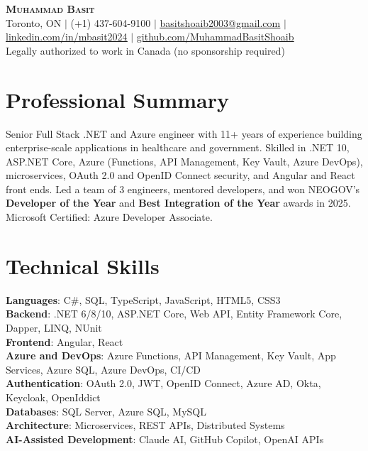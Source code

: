 \documentclass[letterpaper,11pt]{article}
\begin{document}
\begin{center}
    \textbf{\Huge \scshape Muhammad Basit} \\ \vspace{1pt}
    \small Toronto, ON $|$ (+1) 437-604-9100 $|$ \href{mailto:basitshoaib2003@gmail.com}{\underline{basitshoaib2003@gmail.com}} $|$
    \href{https://linkedin.com/in/mbasit2024}{\underline{linkedin.com/in/mbasit2024}} $|$
    \href{https://github.com/MuhammadBasitShoaib}{\underline{github.com/MuhammadBasitShoaib}} \\
    Legally authorized to work in Canada (no sponsorship required)
\end{center}

\section{Professional Summary}
\begin{itemize}[leftmargin=0.15in, label={}]
  \small{\item{
    Senior Full Stack .NET and Azure engineer with 11+ years of experience building enterprise-scale applications in healthcare and government. Skilled in .NET 10, ASP.NET Core, Azure (Functions, API Management, Key Vault, Azure DevOps), microservices, OAuth 2.0 and OpenID Connect security, and Angular and React front ends. Led a team of 3 engineers, mentored developers, and won NEOGOV's \textbf{Developer of the Year} and \textbf{Best Integration of the Year} awards in 2025. Microsoft Certified: Azure Developer Associate.
  }}
\end{itemize}

\section{Technical Skills}
\begin{itemize}[leftmargin=0.15in, label={}]
   \small{\item{
    \textbf{Languages}{: C\#, SQL, TypeScript, JavaScript, HTML5, CSS3} \\
    \textbf{Backend}{: .NET 6/8/10, ASP.NET Core, Web API, Entity Framework Core, Dapper, LINQ, NUnit} \\
    \textbf{Frontend}{: Angular, React} \\
    \textbf{Azure and DevOps}{: Azure Functions, API Management, Key Vault, App Services, Azure SQL, Azure DevOps, CI/CD} \\
    \textbf{Authentication}{: OAuth 2.0, JWT, OpenID Connect, Azure AD, Okta, Keycloak, OpenIddict} \\
    \textbf{Databases}{: SQL Server, Azure SQL, MySQL} \\
    \textbf{Architecture}{: Microservices, REST APIs, Distributed Systems} \\
    \textbf{AI-Assisted Development}{: Claude AI, GitHub Copilot, OpenAI APIs}
   }}
\end{itemize}
\end{document}

